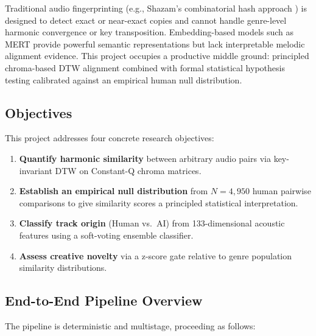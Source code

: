 \documentclass[12pt,a4paper]{article}
\begin{document}
Traditional audio fingerprinting (e.g., Shazam's combinatorial hash approach
\cite{wang2003industrial}) is designed to detect exact or near-exact copies
and cannot handle genre-level harmonic convergence or key transposition.
Embedding-based models such as MERT \cite{li2023mert} provide powerful
semantic representations but lack interpretable melodic alignment evidence.
This project occupies a productive middle ground: principled chroma-based
DTW alignment \cite{muller2015fundamentals} combined with formal statistical
hypothesis testing calibrated against an empirical human null distribution.

\subsection{Objectives}

This project addresses four concrete research objectives:
\begin{enumerate}[noitemsep]
  \item \textbf{Quantify harmonic similarity} between arbitrary audio pairs
        via key-invariant DTW on Constant-Q chroma matrices.
  \item \textbf{Establish an empirical null distribution} from $N = 4{,}950$
        human pairwise comparisons to give similarity scores a principled
        statistical interpretation.
  \item \textbf{Classify track origin} (Human vs.\ AI) from 133-dimensional
        acoustic features using a soft-voting ensemble classifier.
  \item \textbf{Assess creative novelty} via a z-score gate relative to genre
        population similarity distributions.
\end{enumerate}

\subsection{End-to-End Pipeline Overview}

The pipeline is deterministic and multistage, proceeding as follows:
\end{document}
